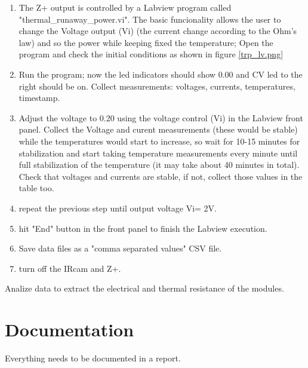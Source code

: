 \documentclass[12pt]{unlsilabsop}
\begin{document}
\begin{enumerate}
    \item The Z+ output is controlled by a Labview program called "thermal_runaway_power.vi". The basic funcionality allows the user to change the Voltage output (Vi) (the current change according to the Ohm's law) and so the power while keeping fixed the temperature; Open the program and check the initial conditions as shown in figure \ref{trp_lv.png} 
    \item Run the program; now the led indicators should show 0.00 and CV led to the right should be on. Collect measurements: voltages, currents, temperatures, timestamp.
    \item Adjust the voltage to 0.20 using the voltage control (Vi) in the Labview front panel. Collect the Voltage and curent measurements (these would be stable) while the temperatures would start to increase, so wait for 10-15 minutes for stabilization and start taking temperature measurements every minute until full stabilization of the temperature (it may take about 40 minutes in total). Check that voltages and currents are stable, if not, collect those values in the table too.  
    \item repeat the previous step until output voltage Vi= 2V.
    \item hit "End" button in the front panel to finish the Labview execution.
    \item Save data files as a "comma separated values" CSV file.
    \item turn off the IRcam and Z+.
\end{enumerate}

Analize data to extract the electrical and thermal resistance of the modules.

\section{Documentation}
Everything needs to be documented in a report.
\end{document}
